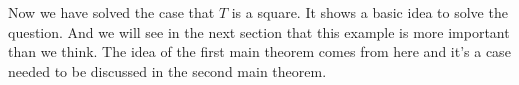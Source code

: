Now we have solved the case that $T$ is a square. It shows a basic 
idea to solve the question. And we will see in the next section 
that this example is more important than we think. The idea of the 
first main theorem comes from here and it's a case needed to be 
discussed in the second main theorem.